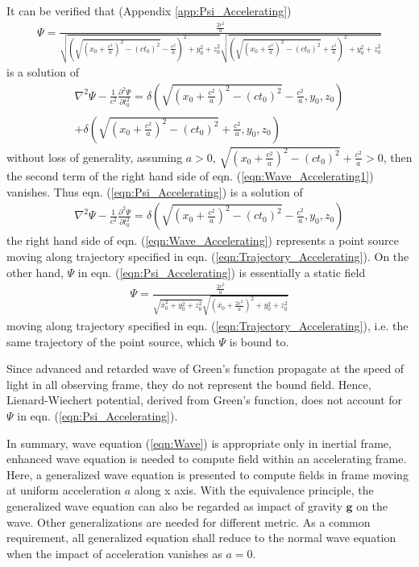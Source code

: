 \documentclass[prd,showpacs,preprint]{revtex4}
\begin{document}
It can be verified that (Appendix \ref{app:Psi_Accelerating})
\begin{eqnarray}
\Psi=\frac{\frac{2c^2}{a}}{\sqrt{(\sqrt{(x_0+\frac{c^2}{a})^2-(ct_0)^2}-\frac{c^2}{a})^2+y_0^2+z_0^2}\sqrt{(\sqrt{(x_0+\frac{c^2}{a})^2-(ct_0)^2}+\frac{c^2}{a})^2+y_0^2+z_0^2}}
\label{eqn:Psi_Accelerating}
\end{eqnarray}
is a solution of
\begin{eqnarray}
\nabla^2\Psi-\frac{1}{c^2}\frac{\partial^2 \Psi}{\partial t_0^2}=\delta(\sqrt{(x_0+\frac{c^2}{a})^2-(ct_0)^2}-\frac{c^2}{a},y_0,z_0)\nonumber\\
+\delta(\sqrt{(x_0+\frac{c^2}{a})^2-(ct_0)^2}+\frac{c^2}{a},y_0,z_0)
\label{eqn:Wave_Accelerating1}
\end{eqnarray}
without loss of generality, assuming $a>0$, $\sqrt{(x_0+\frac{c^2}{a})^2-(ct_0)^2}+\frac{c^2}{a}>0$, then the second term of the right hand side of eqn. (\ref{eqn:Wave_Accelerating1}) vanishes. Thus eqn. (\ref{eqn:Psi_Accelerating}) is a solution of
\begin{eqnarray}
\nabla^2\Psi-\frac{1}{c^2}\frac{\partial^2 \Psi}{\partial t_0^2}=\delta(\sqrt{(x_0+\frac{c^2}{a})^2-(ct_0)^2}-\frac{c^2}{a},y_0,z_0)
\label{eqn:Wave_Accelerating}
\end{eqnarray}
the right hand side of eqn. (\ref{eqn:Wave_Accelerating}) represents a point source moving along trajectory specified in eqn. (\ref{eqn:Trajectory_Accelerating}). On the other hand, $\Psi$ in eqn. (\ref{eqn:Psi_Accelerating}) is essentially a static field
\begin{eqnarray}
\Psi=\frac{\frac{2c^2}{a}}{\sqrt{\bar x_0^2+y_0^2+z_0^2}\sqrt{(\bar x_0+\frac{2c^2}{a})^2+y_0^2+z_0^2}}
\end{eqnarray}
moving along trajectory specified in eqn. (\ref{eqn:Trajectory_Accelerating}), i.e. the same trajectory of the point source, which $\Psi$ is bound to.

Since advanced and retarded wave of Green's function propagate at the speed of light in all observing frame, they do not represent the bound field. Hence, Lienard-Wiechert potential, derived from Green's function, does not account for $\Psi$ in eqn. (\ref{eqn:Psi_Accelerating}).

In summary, wave equation (\ref{eqn:Wave}) is appropriate only in inertial frame, enhanced wave equation is needed to compute field within an accelerating frame. Here, a generalized wave equation is presented to compute fields in frame moving at uniform acceleration $a$ along x axis. With the equivalence principle, the generalized wave equation can also be regarded as impact of gravity $\mathbf{g}$ on the wave. Other generalizations are needed for different metric. As a common requirement, all generalized equation shall reduce to the normal wave equation when the impact of acceleration vanishes as $a=0$.
\end{document}
